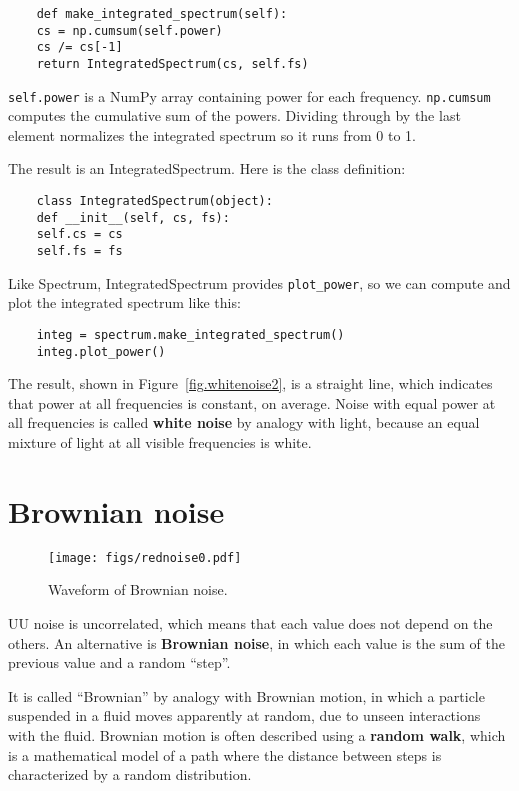 \begin{verbatim}
	def make_integrated_spectrum(self):
	cs = np.cumsum(self.power)
	cs /= cs[-1]
	return IntegratedSpectrum(cs, self.fs)
\end{verbatim}

{\tt self.power} is a NumPy array containing power for each frequency.
{\tt np.cumsum} computes the cumulative sum of the powers.
Dividing through by the last element normalizes the integrated
spectrum so it runs from 0 to 1.

The result is an IntegratedSpectrum.  Here is the class definition:

\begin{verbatim}
	class IntegratedSpectrum(object):
	def __init__(self, cs, fs):
	self.cs = cs
	self.fs = fs
\end{verbatim}

Like Spectrum, IntegratedSpectrum provides \verb"plot_power", so
we can compute and plot the integrated spectrum like this:

\begin{verbatim}
	integ = spectrum.make_integrated_spectrum()
	integ.plot_power()
\end{verbatim}

The result, shown in Figure~\ref{fig.whitenoise2}, is a straight line,
which indicates that power at all frequencies is constant, on average.
Noise with equal power at all frequencies is called {\bf white noise}
by analogy with light, because an equal mixture of light at all
visible frequencies is white.



\section{Brownian noise}
\label{brownian}

\begin{figure}
	\centerline{\texttt{[image: figs/rednoise0.pdf]}}
	\caption{Waveform of Brownian noise.}
	\label{fig.rednoise0}
\end{figure}

UU noise is uncorrelated, which means that each value does not depend
on the others.  An alternative is {\bf Brownian noise}, in which each value
is the sum of the previous value and a random ``step''.

It is called ``Brownian'' by analogy with Brownian motion, in which a
particle suspended in a fluid moves apparently at random, due to
unseen interactions with the fluid.  Brownian motion is often
described using a {\bf random walk}, which is a mathematical model
of a path where the distance between steps is characterized by a
random distribution.

